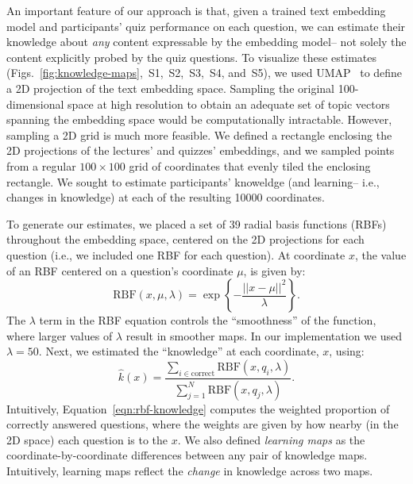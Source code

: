 \documentclass[10pt]{article}
\newcommand{\individualKnowledgeMapsA}{S1}
\newcommand{\individualKnowledgeMapsB}{S2}
\newcommand{\individualKnowledgeMapsC}{S3}
\newcommand{\individualLearningMapsA}{S4}
\newcommand{\individualLearningMapsB}{S5}
\begin{document}
An important feature of our approach is that, given a trained text embedding
model and participants' quiz performance on each question, we can estimate
their knowledge about \textit{any} content expressable by the embedding model--
not solely the content explicitly probed by the quiz questions. To visualize
these estimates
(Figs.~\ref{fig:knowledge-maps},~\individualKnowledgeMapsA,~\individualKnowledgeMapsB,~\individualKnowledgeMapsC,~\individualLearningMapsA,
and~\individualLearningMapsB), we used UMAP~\citep{McInEtal18a} to define a 2D
projection of the text embedding space. Sampling the original 100-dimensional
space at high resolution to obtain an adequate set of topic vectors spanning
the embedding space would be computationally intractable. However, sampling a
2D grid is much more feasible. We defined a rectangle enclosing the 2D
projections of the lectures' and quizzes' embeddings, and we sampled points
from a regular $100 \times 100$ grid of coordinates that evenly tiled the
enclosing rectangle. We sought to estimate participants' knoweldge (and
learning-- i.e., changes in knowledge) at each of the resulting 10000
coordinates.

To generate our estimates, we placed a set of 39 radial basis functions (RBFs)
throughout the embedding space, centered on the 2D projections for each
question (i.e., we included one RBF for each question). At coordinate $x$, the
value of an RBF centered on a question's coordinate $\mu$, is given by:
\begin{equation}
    \mathrm{RBF}(x, \mu, \lambda) = \exp\left\{-\frac{||x - \mu||^2}{\lambda}\right\}.
    \label{eqn:rbf}
\end{equation}
The $\lambda$ term in the RBF equation controls the ``smoothness'' of the
function, where larger values of $\lambda$ result in smoother maps. In our
implementation we used $\lambda = 50$.  Next, we estimated the ``knowledge''
at each coordinate, $x$, using:
\begin{equation}
    \hat{k}(x) = \frac{\sum_{i \in \mathrm{correct}} \mathrm{RBF}(x, q_i, \lambda)}{\sum_{j = 1}^N \mathrm{RBF}(x, q_j, \lambda)}.
    \label{eqn:rbf-knowledge}
\end{equation}
Intuitively, Equation~\ref{eqn:rbf-knowledge} computes the weighted proportion of
correctly answered questions, where the weights are given by how nearby (in the 2D space)
each question is to the $x$.  We also defined \textit{learning maps} as the coordinate-by-coordinate
differences between any pair of knowledge maps.  Intuitively, learning maps reflect the \textit{change}
in knowledge across two maps.
\end{document}
